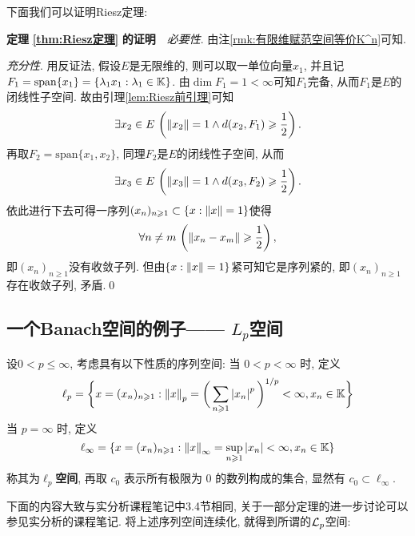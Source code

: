 	下面我们可以证明Riesz定理:
	
	\textbf{定理\,\,\ref{thm:Riesz定理}\,\,的证明}\ \ \textsl{必要性}. 由注\ref{rmk:有限维赋范空间等价K^n}可知.
	
	\textsl{充分性}. 用反证法, 假设$ E $是无限维的, 则可以取一单位向量$ x_1 $, 并且记$ F_1=\mathrm{span}\{x_1\}=\{ \lambda_1x_1 : \lambda_1\in\mathbb{K} \} $. 由$ \dim F_1=1<\infty $可知$ F_1 $完备, 从而$ F_1 $是$ E $的闭线性子空间. 故由引理\ref{lem:Riesz前引理}可知
	\[
	\exists x_2\in E\,\left(\left\| x_2 \right\|=1\land d(x_2,F_1)\geqslant\frac{1}{2}\right).
	\]
	再取$ F_2=\mathrm{span}\{x_1,x_2\} $, 同理$ F_2 $是$ E $的闭线性子空间, 从而
	\[
	\exists x_3\in E\,\left(\left\| x_3 \right\|=1\land d(x_3,F_2)\geqslant\frac{1}{2}\right).
	\]
	依此进行下去可得一序列$ (x_n)_{n\geqslant 1}\subset\{ x : \left\| x \right\|=1 \} $使得
	\[
	\forall n\ne m\,\left(\left\| x_n-x_m \right\|\geqslant\frac{1}{2}\right),
	\]
	即$ (x_n)_{n\geqslant 1} $没有收敛子列. 但由$ \{ x : \left\| x \right\|=1 \} $紧可知它是序列紧的, 即$ (x_n)_{n\geqslant 1} $存在收敛子列, 矛盾.\qed
	
     \subsection{一个Banach空间的例子—— $ L_p $空间}
     
     \begin{Definition}[$ \ell_{p} $空间]\label{def:lp空间}
		设$ 0<p\leqslant\infty $, 考虑具有以下性质的序列空间:
          当 $ 0<p<\infty $ 时, 定义
          \[
               \ell_{p}=\bigg\{ x=(x_{n})_{n\geqslant1}: \left\| x \right\|_{p}=\bigg( \sum\limits_{n\geqslant1}\left| x_{n} \right| ^{p} \bigg)^{1/p}<\infty, x_{n}\in\mathbb{K} \bigg\}
          \]
           当 $ p=\infty $ 时, 定义
           \[
                \ell_{\infty}=\{ x=(x_{n})_{n\geqslant1}:\left\| x \right\|_{\infty}=\sup_{n\geqslant1}\left| x_{n} \right| <\infty, x_{n}\in\mathbb{K} \}
           \]
           称其为\textbf{$ \ell_{p} $空间}, 再取 $ c_{0} $ 表示所有极限为 $ 0 $ 的数列构成的集合, 显然有 $ c_{0}\subset\ell_{\infty} $. 
     \end{Definition}
	
	下面的内容大致与实分析课程笔记中3.4节相同, 关于一部分定理的进一步讨论可以参见实分析的课程笔记. 将上述序列空间连续化, 就得到所谓的$ \mathcal{L}_p $空间:
	
